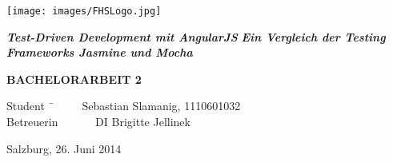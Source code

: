 \begin{titlepage}
\begin{center}

\texttt{[image: images/FHSLogo.jpg]}

\vspace*{4cm}

\Large{
  \textit{\textbf{Test-Driven Development mit AngularJS}}
}
\newline
\large{
  \textit{\textbf{Ein Vergleich der Testing Frameworks Jasmine und Mocha}}
}

\vspace*{4cm}

\large{
  \textbf{BACHELORARBEIT 2}
}

\end{center}

\vfill

\begin{tabbing}
Student \= \ \ \ \ \ \ Sebastian Slamanig, 1110601032 \\
Betreuerin \> \ \ \ \ \ \ DI Brigitte Jellinek
\end{tabbing}

Salzburg, 26. Juni 2014

\end{titlepage}